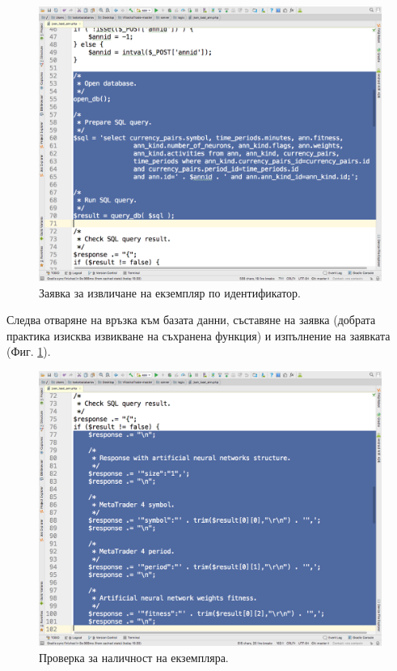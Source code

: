 \documentclass[book,14pt,oneside,openany]{memoir}
\begin{document}
\begin{figure}[h]
  \centering
  \includegraphics[height=0.45\pdfpageheight]{pic0116}
  \caption{Заявка за извличане на екземпляр по идентификатор.}
\label{fig:pic0116}
\end{figure}
\FloatBarrier

Следва отваряне на връзка към базата данни, съставяне на заявка (добрата практика изисква извикване на съхранена функция) и изпълнение на заявката (Фиг. \ref{fig:pic0116}). 

\begin{figure}[h]
  \centering
  \includegraphics[height=0.45\pdfpageheight]{pic0117}
  \caption{Проверка за наличност на екземпляра.}
\label{fig:pic0117}
\end{figure}
\FloatBarrier
\end{document}
